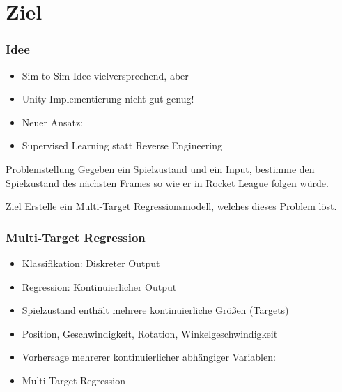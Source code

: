 \documentclass{beamer}
\begin{document}
 \section{Ziel}
\begin{frame}
 \frametitle{Idee}
  \begin{itemize}
   \item Sim-to-Sim Idee vielversprechend, aber
   \item Unity Implementierung nicht gut genug!
   \item Neuer Ansatz:
   \item Supervised Learning statt Reverse Engineering
  \end{itemize}
 \begin{block}{Problemstellung}
  Gegeben ein Spielzustand und ein Input, bestimme den Spielzustand des nächsten Frames so wie er in Rocket League folgen würde.
 \end{block}
  \begin{block}{Ziel}
  Erstelle ein Multi-Target Regressionsmodell, welches dieses Problem löst.
 \end{block}
 \end{frame}

\begin{frame}
 \frametitle{Multi-Target Regression}
  \begin{itemize}
   \item Klassifikation: Diskreter Output
   \item Regression: Kontinuierlicher Output
   \item Spielzustand enthält mehrere kontinuierliche Größen (Targets)
   \item Position, Geschwindigkeit, Rotation, Winkelgeschwindigkeit
   \item Vorhersage mehrerer kontinuierlicher abhängiger Variablen:
   \item Multi-Target Regression
  \end{itemize}
 \end{frame}
\end{document}
